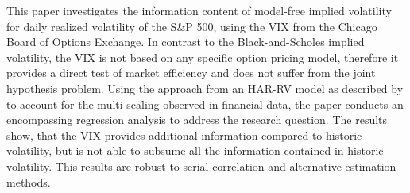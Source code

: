 
This paper investigates the information content of model-free implied volatility for daily realized volatility of the S\&P 500, using the VIX from the Chicago Board of Options Exchange. In contrast to the Black-and-Scholes implied volatility, the VIX is not based on any specific option pricing model, therefore it provides a direct test of market efficiency and does not suffer from the joint hypothesis problem. Using the approach from an HAR-RV model as described by \textcite{corsi2009} to account for the multi-scaling observed  in financial data, the paper conducts an encompassing regression analysis to address the research question. The results show, that the VIX provides additional information compared to historic volatility, but is not able to subsume all the information contained in historic volatility. This results are robust to serial correlation and alternative estimation methods. 